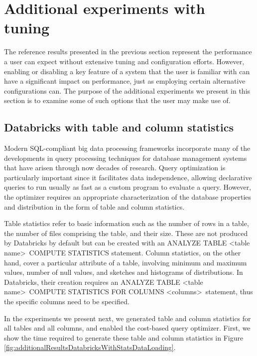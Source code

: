 \section{Additional experiments with tuning}\label{additionalExperiments}

The reference results presented in the previous section represent the performance a user can expect without extensive tuning and configuration efforts. However, enabling or disabling a key feature of a system that the user is familiar with can have a significant impact on performance, just as employing certain alternative configurations can. The purpose of the additional experiments we present in this section is to examine some of such options that the user may make use of.

\subsection{Databricks with table and column statistics}\label{databricksWithStatistics}

Modern SQL-compliant big data processing frameworks incorporate many of the developments in query processing techniques for database management systems that have arisen through now decades of research. Query optimization is particularly important since it facilitates data independence, allowing declarative queries to run usually as fast as a custom program to evaluate a query. However, the optimizer requires an appropriate characterization of the database properties and distribution in the form of table and column statistics.

Table statistics refer to basic information such as the number of rows in a table, the number of files comprising the table, and their size. These are not produced by Databricks by default but can be created with an ANALYZE TABLE \textless table name\textgreater \ COMPUTE STATISTICS statement. Column statistics, on the other hand, cover a particular attribute of a table, involving minimum and maximum values, number of null values, and sketches and histograms of distributions. In Databricks, their creation requires an ANALYZE TABLE \textless table name\textgreater \ COMPUTE STATISTICS FOR COLUMNS \textless columns\textgreater \ statement, thus the specific columns need to be specified.

In the experiments we present next, we generated table and column statistics for all tables and all columns, and enabled the cost-based query optimizer. First, we show the time required to generate these table and column statistics in Figure \ref{fig:additionalResultsDatabricksWithStatsDataLoading}.


